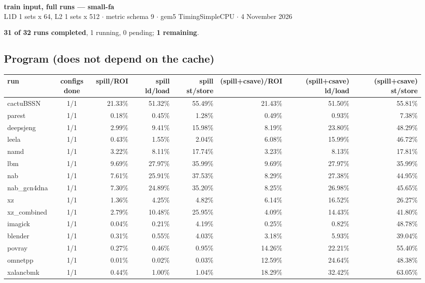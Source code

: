 \documentclass[10pt,a4paper,landscape]{article}
\begin{document}
\begin{center}
{\large\bfseries train input, full runs --- small-fa}\\[3pt]
{\small L1D 1 sets x 64, L2 1 sets x 512 $\cdot$ metric schema 9 $\cdot$ gem5 TimingSimpleCPU $\cdot$ 4 November 2026}
\end{center}
\textbf{31 of 32 runs completed}, 1 running, 0 pending; \textbf{1 remaining}.\par
\subsection*{Program (does not depend on the cache)}
{\footnotesize
\begin{longtable}{lcrrrrrr}
\toprule
run & configs done & spill/ROI & spill ld/load & spill st/store & (spill+csave)/ROI & (spill+csave) ld/load & (spill+csave) st/store \\
\midrule
\endhead
\bottomrule
\endfoot
cactuBSSN & 1/1 & 21.33\% & 51.32\% & 55.49\% & 21.43\% & 51.50\% & 55.81\% \\
parest & 1/1 & 0.18\% & 0.45\% & 1.28\% & 0.49\% & 0.93\% & 7.38\% \\
deepsjeng & 1/1 & 2.99\% & 9.41\% & 15.98\% & 8.19\% & 23.80\% & 48.29\% \\
leela & 1/1 & 0.43\% & 1.55\% & 2.04\% & 6.08\% & 15.99\% & 46.72\% \\
namd & 1/1 & 3.22\% & 8.11\% & 17.74\% & 3.23\% & 8.13\% & 17.81\% \\
lbm & 1/1 & 9.69\% & 27.97\% & 35.99\% & 9.69\% & 27.97\% & 35.99\% \\
nab & 1/1 & 7.61\% & 25.91\% & 37.53\% & 8.29\% & 27.38\% & 44.95\% \\
nab\_gcn4dna & 1/1 & 7.30\% & 24.89\% & 35.20\% & 8.25\% & 26.98\% & 45.65\% \\
xz & 1/1 & 1.36\% & 4.25\% & 4.82\% & 6.14\% & 16.52\% & 26.27\% \\
xz\_combined & 1/1 & 2.79\% & 10.48\% & 25.95\% & 4.09\% & 14.43\% & 41.80\% \\
imagick & 1/1 & 0.04\% & 0.21\% & 4.19\% & 0.25\% & 0.82\% & 48.78\% \\
blender & 1/1 & 0.31\% & 0.55\% & 4.03\% & 3.18\% & 5.93\% & 39.04\% \\
povray & 1/1 & 0.27\% & 0.46\% & 0.95\% & 14.26\% & 22.21\% & 55.40\% \\
omnetpp & 1/1 & 0.01\% & 0.02\% & 0.03\% & 12.59\% & 24.64\% & 48.38\% \\
xalancbmk & 1/1 & 0.44\% & 1.00\% & 1.04\% & 18.29\% & 32.42\% & 63.05\% \\

\end{longtable}}
\end{document}
